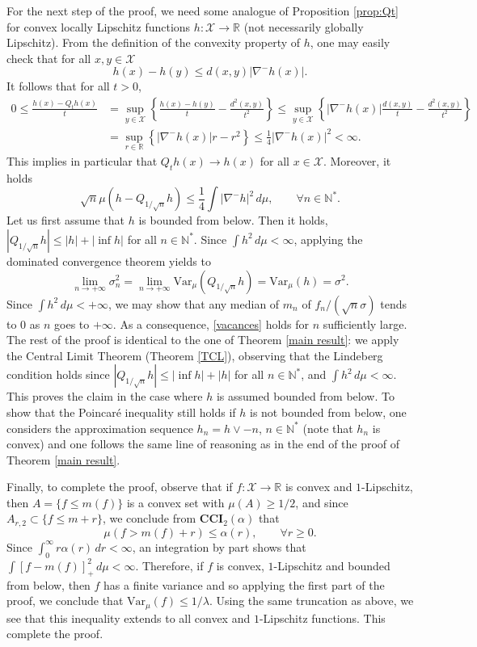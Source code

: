 \documentclass[11pt]{amsart}
\numberwithin{equation}{section}
\begin{document}
For the next step of the proof,  we need some analogue of Proposition \ref{prop:Qt} for convex locally Lipschitz functions $h \colon {\mathcal{X}}\to {\mathbb{R}}$ (not necessarily globally Lipschitz). From  the  
 definition of the convexity property of $h$, one may easily check that  for all  $x,y\in {\mathcal{X}}$ 
\[
h(x)-h(y)\leq d(x,y)|\nabla^- h(x)|.\]
It follows that for all $t>0$,
\begin{align*}
0\leq\frac{h(x)-Q_th(x)}{t}
&=
\sup_{y\in{\mathcal{X}}}\left\{\frac{h(x)-h(y)}{t} - \frac{d^2(x,y)}{t^2}\right\} 
 \leq 
\sup_{y\in{\mathcal{X}}}\left\{|\nabla^- h(x)| \frac{d(x,y)}{t} - \frac{d^2(x,y)}{t^2}\right\} \\
& =
\sup_{r \in \mathbb{R}}\left\{|\nabla^- h(x)| r - r^2\right\}
\leq \frac{1}{4}|\nabla^- h(x)| ^2<\infty.
\end{align*}
This implies in particular that $Q_th(x)\to h(x)$ for all $x\in {\mathcal{X}}$. Moreover, it holds
 \[
\sqrt{n}\mu \left(h-Q_{1/\sqrt{n}}h \right) \leq\frac{1}{4}\int |\nabla^- h|^2\,d\mu,\qquad \forall n\in{\mathbb{N}}^*.
\]
Let us first assume that $h$ is bounded from below. Then it holds, $|Q_{1/\sqrt n}h|\leq |h|+|\inf h|$ for all $n\in{\mathbb{N}}^*$. Since $\int h^2\, d\mu<\infty$, applying the dominated convergence theorem yields to
 \[
 \lim_{n\to+\infty} \sigma_n^2=\lim_{n\to+\infty} \mathrm{Var}_{\mu} (Q_{1/\sqrt{n}} h)=\mathrm{Var}_{\mu} ( h)=\sigma^2.
 \]
 Since $\int h^2\,d\mu<+\infty$, we may  show that  any  median of  $m_n$ of $f_n/(\sqrt n \sigma)$ tends to 0 as $n$ goes to $+\infty$. As a consequence, \eqref{vacances} holds for $n$ sufficiently large. The rest of the proof is identical to the one of Theorem  \ref{main result}:
we  apply the Central Limit Theorem (Theorem \ref{TCL}), observing that the Lindeberg condition holds since $|Q_{1/\sqrt n}h|\leq |\inf h|+|h|$ for all $n\in{\mathbb{N}}^*$, and $\int h^2\, d\mu<\infty$.
This proves the claim in the case where $h$ is assumed bounded from below. To show that the Poincar\'e inequality still holds if $h$ is not bounded from below, one considers the approximation sequence $h_n=h\vee -n$, $n\in{\mathbb{N}}^*$ (note that $h_n$ is convex) and one follows the same line of reasoning as in the end of the proof of Theorem \ref{main result}. 

Finally, to complete the proof, observe that if $f:{\mathcal{X}}\to {\mathbb{R}}$ is convex and $1$-Lipschitz, then $A=\{f\leq m(f)\}$ is a convex set with $\mu(A)\geq 1/2$, and since $A_{r,2}\subset \{f\leq m+r\}$, we conclude from $\mathbf{CCI}_2(\alpha)$ that
\[
\mu(f>m(f)+r)\leq \alpha(r),\qquad \forall r\geq 0.
\]
Since $\int_0^{\infty} r\alpha(r)\,dr<\infty$, an integration by part shows that $\int [f-m(f)]_+^2\,d\mu<\infty.$ Therefore, if $f$ is convex, $1$-Lipschitz and bounded from below, then $f$ has a finite variance and so applying the first part of the proof, we conclude that $\mathrm{Var}_\mu(f)\leq 1/\lambda.$ Using the same truncation as above, we see that this inequality extends to all convex and $1$-Lipschitz functions. This complete the proof.
\endproof
\end{document}
